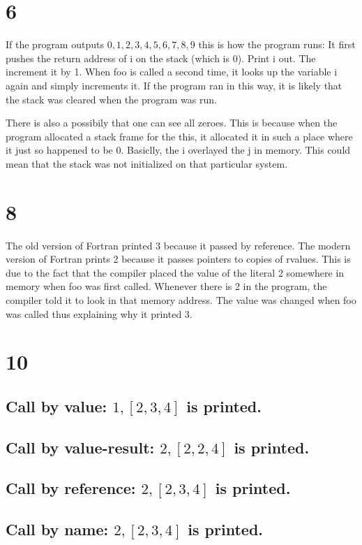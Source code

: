 \documentclass[11pt, oneside]{article}
\begin{document}
\section*{6}
If the program outputs $0, 1, 2, 3, 4, 5, 6, 7, 8, 9$ this is how the program runs: It first pushes the return address of i on the stack (which is 0). Print i out. The increment it by 1. When foo is called a second time, it looks up the variable i again and simply increments it. If the program ran in this way, it is likely that the stack was cleared when the program was run.

There is also a possibily that one can see all zeroes. This is because when the program allocated a stack frame for the  this, it allocated it in such a place where it just so happened to be 0. Basiclly, the i overlayed the j in memory. This could mean that the stack was not initialized on that particular system.

\section*{8}
The old version of Fortran printed 3 because it passed by reference. The modern version of Fortran prints 2 because it passes pointers to copies of rvalues. This is due to the fact that the compiler placed the value of the literal 2 somewhere in memory when foo was first called. Whenever there is 2 in the program, the compiler told it to look in that memory address. The value was changed when foo was called thus explaining why it printed 3.

\section*{10}
\subsection*{Call by value: $1, [2, 3, 4]$ is printed.}
\subsection*{Call by value-result: $2, [2, 2, 4]$ is printed.}
\subsection*{Call by reference: $2, [2, 3, 4]$ is printed.}
\subsection*{Call by name: $2, [2, 3, 4]$ is printed.}
\end{document}
